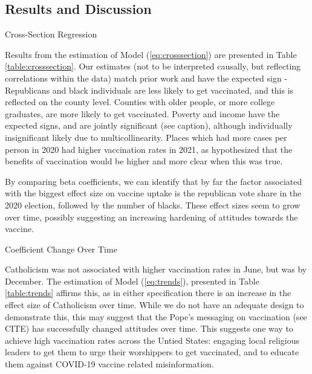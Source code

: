 \documentclass[12pt]{article}
\begin{document}
\begin{spacing}{1.5}
		\section{Results and Discussion}
		
		\begin{table}
			\centering
			\caption{Cross-Section Regression}
			\centerline{}
			\label{table:crosssection}
		\end{table}
		
		Results from the estimation of Model (\ref{eq:crosssection}) are presented in Table \ref{table:crosssection}. Our estimates (not to be interpreted causally, but reflecting correlations within the data) match prior work and have the expected sign - Republicans and black individuals are less likely to get vaccinated, and this is reflected on the county level. Counties with older people, or more college graduates, are more likely to get vaccinated. Poverty and income have the expected signs, and are jointly significant (see caption), although individually insignificant likely due to multicollinearity. Places which had more cases per person in 2020 had higher vaccination rates in 2021, as hypothesized that the benefits of vaccination would be higher and more clear when this was true.
		
		By comparing beta coefficients, we can identify that by far the factor associated with the biggest effect size on vaccine uptake is the republican vote share in the 2020 election, followed by the number of blacks. These effect sizes seem to grow over time, possibly suggesting an increasing hardening of attitudes towards the vaccine.
		
		\begin{table}
			\centering
			\caption{Coefficient Change Over Time}
			
			\label{table:trends}
		\end{table}
		
		Catholicism was not associated with higher vaccination rates in June, but was by December. The estimation of Model (\ref{eq:trends}), presented in Table \ref{table:trends} affirms this, as in either specification there is an increase in the effect size of Catholicism over time. While we do not have an adequate design to demonstrate this, this may suggest that the Pope's messaging on vaccination (see CITE) has successfully changed attitudes over time. This suggests one way to achieve high vaccination rates across the Untied States: engaging local religious leaders to get them to urge their worshippers to get vaccinated, and to educate them against COVID-19 vaccine related misinformation.
		

\end{spacing}
\end{document}
